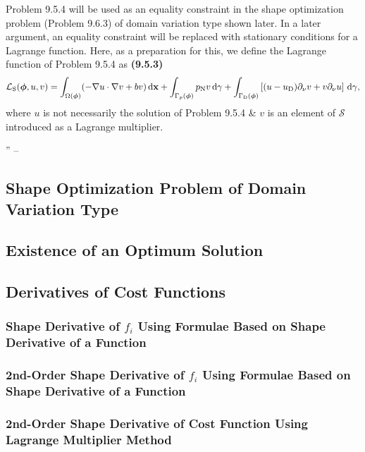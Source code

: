 \documentclass[oneside]{book}
\numberwithin{equation}{section}
\begin{document}
Problem 9.5.4 will be used as an equality constraint in the shape optimization problem (Problem 9.6.3) of domain variation type shown later. In a later argument, an equality constraint will be replaced with stationary conditions for a Lagrange function. Here, as a preparation for this, we define the Lagrange function of Problem 9.5.4 as \textbf{(9.5.3)}
\begin{align*}
	\mathcal{L}_{\rm S}(\boldsymbol{\phi},u,v) = \int_{\Omega(\boldsymbol{\phi})} (-\nabla u\cdot\nabla v + bv)\,{\rm d}{\bf x} + \int_{\Gamma_p(\boldsymbol{\phi})} p_{\rm N}v\,{\rm d}\gamma + \int_{\Gamma_{\rm D}(\boldsymbol{\phi})} \left[(u - u_{\rm D})\partial_\nu v + v\partial_\nu u\right]\,{\rm d}\gamma,
\end{align*}
where $u$ is not necessarily the solution of Problem 9.5.4 \& $v$ is an element of $\mathcal{S}$ introduced as a Lagrange multiplier.

'' -- \cite[pp. 464--]{Azegami2020}

\subsection{Shape Optimization Problem of Domain Variation Type}

\subsection{Existence of an Optimum Solution}

\subsection{Derivatives of Cost Functions}

\subsubsection{Shape Derivative of $f_i$ Using Formulae Based on Shape Derivative of a Function}

\subsubsection{2nd-Order Shape Derivative of $f_i$ Using Formulae Based on Shape Derivative of a Function}

\subsubsection{2nd-Order Shape Derivative of Cost Function Using Lagrange Multiplier Method}
\end{document}
